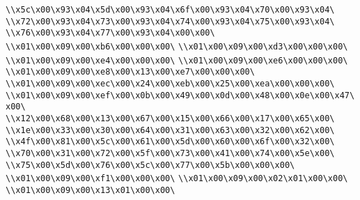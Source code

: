\verb|\\x5c\x00\x93\x04\x5d\x00\x93\x04\x6f\x00\x93\x04\x70\x00\x93\x04\|\newline
\verb|\\x72\x00\x93\x04\x73\x00\x93\x04\x74\x00\x93\x04\x75\x00\x93\x04\|\newline
\verb|\\x76\x00\x93\x04\x77\x00\x93\x04\x00\x00\|\newline
\verb|\\x01\x00\x09\x00\xb6\x00\x00\x00\|\newline
\verb|\\x01\x00\x09\x00\xd3\x00\x00\x00\|\newline
\verb|\\x01\x00\x09\x00\xe4\x00\x00\x00\|\newline
\verb|\\x01\x00\x09\x00\xe6\x00\x00\x00\|\newline
\verb|\\x01\x00\x09\x00\xe8\x00\x13\x00\xe7\x00\x00\x00\|\newline
\verb|\\x01\x00\x09\x00\xec\x00\x24\x00\xeb\x00\x25\x00\xea\x00\x00\x00\|\newline
\verb|\\x01\x00\x09\x00\xef\x00\x0b\x00\x49\x00\x0d\x00\x48\x00\x0e\x00\x47\x00\|\newline
\verb|\\x12\x00\x68\x00\x13\x00\x67\x00\x15\x00\x66\x00\x17\x00\x65\x00\|\newline
\verb|\\x1e\x00\x33\x00\x30\x00\x64\x00\x31\x00\x63\x00\x32\x00\x62\x00\|\newline
\verb|\\x4f\x00\x81\x00\x5c\x00\x61\x00\x5d\x00\x60\x00\x6f\x00\x32\x00\|\newline
\verb|\\x70\x00\x31\x00\x72\x00\x5f\x00\x73\x00\x41\x00\x74\x00\x5e\x00\|\newline
\verb|\\x75\x00\x5d\x00\x76\x00\x5c\x00\x77\x00\x5b\x00\x00\x00\|\newline
\verb|\\x01\x00\x09\x00\xf1\x00\x00\x00\|\newline
\verb|\\x01\x00\x09\x00\x02\x01\x00\x00\|\newline
\verb|\\x01\x00\x09\x00\x13\x01\x00\x00\|\newline
